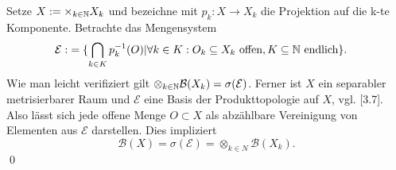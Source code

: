 \begin{proof*}
    Setze $X:= \times_{k \in \mathbb{N}}X_k$ und bezeichne mit $p_k: X \to X_k$ die Projektion auf die k-te Komponente. Betrachte das Mengensystem
    \begin{align*}
        \mathcal{E} :&= \{ \bigcap_{k \in K}p_k^{-1}(O) | \forall k \in K: O_k \subseteq X_k \text{ offen}, K \subseteq \mathbb{N} \text{ endlich}\}. 
    \end{align*}
    Wie man leicht verifiziert gilt $\otimes_{k \in \mathbb{N}}\mathcal{B}(X_k) = \sigma(\mathcal{E})$. 
    Ferner ist $X$ ein separabler metrisierbarer Raum und $\mathcal{E}$ eine Basis der Produkttopologie auf $X$, vgl. \cite{querenburg}[3.7]. 
    Also lässt sich jede offene Menge $O \subset X$ als abzählbare Vereinigung von Elementen aus $\mathcal{E}$ darstellen.  
    Dies impliziert 
    \[
    \mathcal{B}(X) = \sigma(\mathcal{E}) = \otimes_{k \in N}\mathcal{B}(X_k).
    \]
    \qed
\end{proof*}
